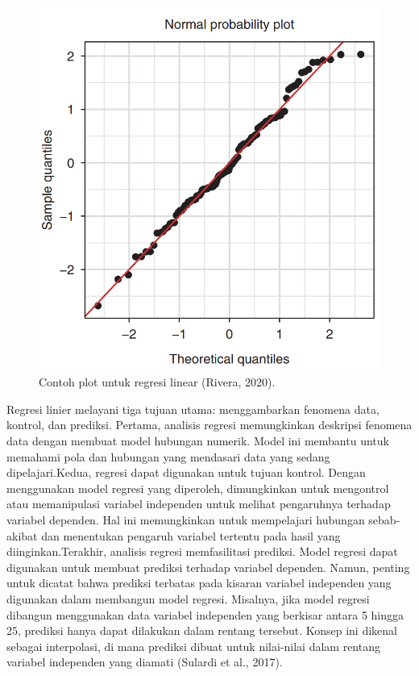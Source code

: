 \begin{figure}[H]
  \centering
  \includegraphics[scale=0.4]{gambar/plotregresilinear.png}
  \caption{Contoh plot untuk regresi linear (Rivera, 2020).}
  \label{fig:plotregresilinear}
\end{figure}

Regresi linier melayani tiga tujuan utama: menggambarkan fenomena data, kontrol, dan prediksi. Pertama, analisis regresi memungkinkan deskripsi fenomena data dengan membuat model hubungan numerik. Model ini membantu untuk memahami pola dan hubungan yang mendasari data yang sedang dipelajari.Kedua, regresi dapat digunakan untuk tujuan kontrol. Dengan menggunakan model regresi yang diperoleh, dimungkinkan untuk mengontrol atau memanipulasi variabel independen untuk melihat pengaruhnya terhadap variabel dependen. Hal ini memungkinkan untuk mempelajari hubungan sebab-akibat dan menentukan pengaruh variabel tertentu pada hasil yang diinginkan.Terakhir, analisis regresi memfasilitasi prediksi. Model regresi dapat digunakan untuk membuat prediksi terhadap variabel dependen. Namun, penting untuk dicatat bahwa prediksi terbatas pada kisaran variabel independen yang digunakan dalam membangun model regresi. Misalnya, jika model regresi dibangun menggunakan data variabel independen yang berkisar antara 5 hingga 25, prediksi hanya dapat dilakukan dalam rentang tersebut. Konsep ini dikenal sebagai interpolasi, di mana prediksi dibuat untuk nilai-nilai dalam rentang variabel independen yang diamati (Sulardi et al., 2017).

